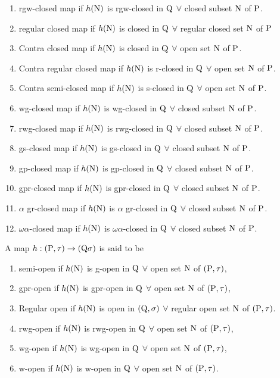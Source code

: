 \begin{dfn}
\begin{enumerate}
\item rgw-closed map \cite{key25} if $h(\mathrm{N})$ is rgw-closed in $\mathrm{Q}$ $\forall$ closed subset $\mathrm{N}$ of $\mathrm{P}$. 
\item regular closed map\cite{key30} if $h(\mathrm{N})$ is closed in $\mathrm{Q}$ $\forall$ regular closed set $\mathrm{N}$ of $\mathrm{P}$ 
\item Contra closed map \cite{key4} if $h(\mathrm{N})$ is closed in $\mathrm{Q}$ $\forall$ open set $\mathrm{N}$ of $\mathrm{P}$. 
\item Contra regular closed map \cite{key30} if $h(\mathrm{N})$ is r-closed in $\mathrm{Q}$ $\forall$ open set $\mathrm{N}$ of $\mathrm{P}$. 
\item Contra semi-closed map \cite{key27} if $h(\mathrm{N})$ is s-closed in $\mathrm{Q}$ $\forall$ open set $\mathrm{N}$ of $\mathrm{P}$. 
\item wg-closed map \cite{key26} if $h(\mathrm{N})$ is wg-closed in $\mathrm{Q}$ $\forall$ closed subset $\mathrm{N}$ of $\mathrm{P}$. 
\item rwg-closed map \cite{key26} if $h(\mathrm{N})$ is rwg-closed in $\mathrm{Q}$ $\forall$ closed subset $\mathrm{N}$ of $\mathrm{P}$. 
\item gs-closed map \cite{key3} if $h(\mathrm{N})$ is gs-closed in $\mathrm{Q}$ $\forall$ closed subset $\mathrm{N}$ of $\mathrm{P}$. 
\item gp-closed map \cite{key21} if $h(\mathrm{N})$ is gp-closed in $\mathrm{Q}$ $\forall$ closed subset $\mathrm{N}$ of $\mathrm{P}$. 
\item gpr-closed map \cite{key13} if $h(\mathrm{N})$ is gpr-closed in $\mathrm{Q}$ $\forall$ closed subset $\mathrm{N}$ of $\mathrm{P}$. 
\item $\alpha$ gr-closed map \cite{key34} if $h(\mathrm{N})$ is $\alpha$ gr-closed in $\mathrm{Q}$ $\forall$ closed subset $\mathrm{N}$ of $\mathrm{P}$. 
\item $\omega\alpha$-closed map \cite{key9} if $h(\mathrm{N})$ is $\omega\alpha$-closed in $\mathrm{Q}$ $\forall$ closed subset $\mathrm{N}$ of $\mathrm{P}$. 
\end{enumerate}
\end{dfn}

\begin{dfn}\label{dfn1.4.2}
A map $h: (\mathrm{P}, \tau) \rightarrow (\mathrm{Q} \sigma)$ is said to be 
\begin{enumerate}
\item semi-open \cite{key15} if $h(\mathrm{N})$ is g-open in $\mathrm{Q}$ $\forall$ open set $\mathrm{N}$ of $(\mathrm{P}, \tau)$, 
\item gpr-open \cite{key13} if $h(\mathrm{N})$ is gpr-open in $\mathrm{Q}$ $\forall$ open set $\mathrm{N}$ of $(\mathrm{P}, \tau)$, 
\item Regular open \cite{key29} if $h(\mathrm{N})$ is open in $(\mathrm{Q}, \sigma)$ $\forall$ regular open set $\mathrm{N}$ of $(\mathrm{P}, \tau)$. 
\item rwg-open \cite{key26} if $h(\mathrm{N})$ is rwg-open in $\mathrm{Q}$ $\forall$ open set $\mathrm{N}$ of $(\mathrm{P}, \tau)$, 
\item wg-open \cite{key26} if $h(\mathrm{N})$ is wg-open in $\mathrm{Q}$ $\forall$ open set $\mathrm{N}$ of $(\mathrm{P}, \tau)$, 
\item w-open \cite{key31} if $h(\mathrm{N})$ is w-open in $\mathrm{Q}$ $\forall$ open set $\mathrm{N}$ of $(\mathrm{P}, \tau)$.
\end{enumerate}
\end{dfn}

